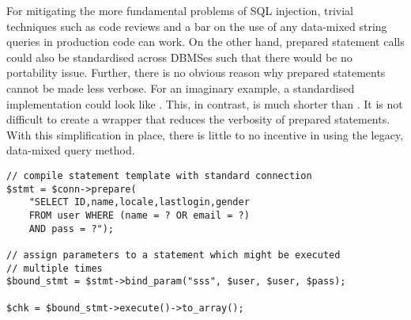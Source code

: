 For mitigating the more fundamental problems of SQL injection, trivial techniques such as code reviews and a bar on the use of any data-mixed string queries in production code can work. On the other hand, prepared statement calls could also be standardised across DBMSes such that there would be no portability issue. Further, there is no obvious reason why prepared statements cannot be made less verbose. For an imaginary example, a standardised implementation could look like . This, in contrast, is much shorter than . It is not difficult to create a wrapper that reduces the verbosity of prepared statements. With this simplification in place, there is little to no incentive in using the legacy, data-mixed query method.

\begin{minipage}{\linewidth}
\begin{lstlisting}[caption={Simpler prepared statements},
label={lst:l4_ref_img},
frame=single]
// compile statement template with standard connection
$stmt = $conn->prepare(
    "SELECT ID,name,locale,lastlogin,gender
    FROM user WHERE (name = ? OR email = ?)
    AND pass = ?");

// assign parameters to a statement which might be executed
// multiple times
$bound_stmt = $stmt->bind_param("sss", $user, $user, $pass);

$chk = $bound_stmt->execute()->to_array();
\end{lstlisting}
\end{minipage}